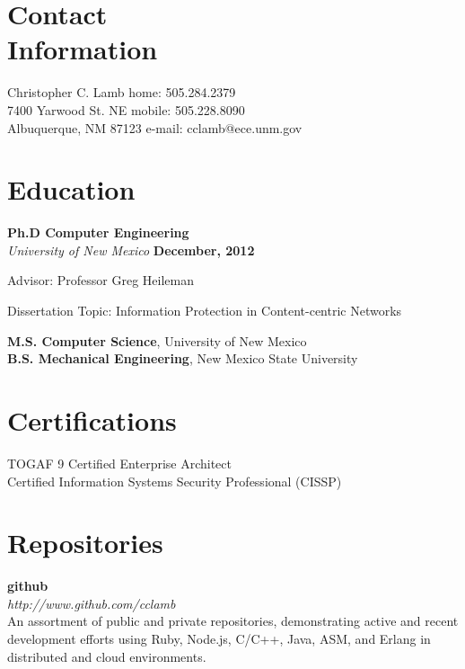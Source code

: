 \documentclass[margin,line]{resume}
\begin{document}
\begin{resume}

\section{\mysidestyle Contact\\Information}
Christopher C. Lamb							\hfill home: 505.284.2379				\vspace{0mm}\\\vspace{0mm}%
7400 Yarwood St. NE							\hfill mobile: 505.228.8090      		\vspace{0mm}\\\vspace{0mm}%
Albuquerque, NM 87123						\hfill e-mail: cclamb@ece.unm.gov		  	\vspace{0mm}\\\vspace{-4.5mm}%

\section{\mysidestyle Education}

\textbf{Ph.D Computer Engineering} \\
\textsl{University of New Mexico} \hfill \textbf{December, 2012} \\\vspace{-3mm}%
\begin{list2}
\item Advisor:  Professor Greg Heileman
\item Dissertation Topic: Information Protection in Content-centric Networks
\end{list2}
{\bf M.S. Computer Science}, University of New Mexico \\
{\bf B.S. Mechanical Engineering}, New Mexico State University

\section{\mysidestyle Certifications}
TOGAF 9 Certified Enterprise Architect \\
Certified Information Systems Security Professional (CISSP)

\section{\mysidestyle Repositories}
{\bf github} \vspace{2mm}  \\
{\sl http://www.github.com/cclamb} \vspace{1mm} \\
An assortment of public and private repositories, demonstrating active and recent development efforts using Ruby, Node.js, C/C++, Java, ASM, and Erlang in distributed and cloud environments.


\end{resume}
\end{document}
